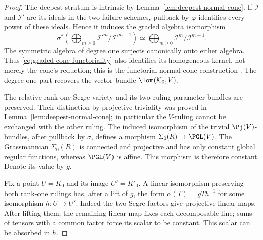 \begin{proof}
The deepest stratum is intrinsic by
Lemma~\ref{lem:deepest-normal-cone}.  If \(\mathcal I\) and
\(\mathcal I'\) are its ideals in the two failure schemes, pullback
by \(\varphi\) identifies every power of these ideals.  Hence it
induces the graded algebra isomorphism
\begin{equation}\label{eq:graded-cone-functoriality}
 \sigma^*\!\left(\bigoplus_{m\ge0}
                  \mathcal I'^m/\mathcal I'^{m+1}\right)
       \simeq \bigoplus_{m\ge0}\mathcal I^m/\mathcal I^{m+1}.
\end{equation}
The symmetric algebra of degree one surjects canonically onto either
algebra.  Thus \eqref{eq:graded-cone-functoriality} also identifies
its homogeneous kernel, not merely the cone's reduction; this is the
functorial normal-cone construction \cite{StacksNormalCone}.
The degree-one part recovers the vector bundle
\(\Hom(\mathcal K_0,V)\).

The relative rank-one Segre variety and its two ruling parameter
bundles are preserved.  Their distinction by projective triviality
was proved in Lemma~\ref{lem:deepest-normal-cone}; in particular the
\(V\)-ruling cannot be exchanged with the other ruling.  The induced
isomorphism of the trivial \(\Pj(V)\)-bundles, after pullback by
\(\sigma\), defines a morphism
\(\Sigma_0(R)\to\PGL(V)\).  The Grassmannian \(\Sigma_0(R)\)
is connected and projective and has only constant global regular
functions, whereas \(\PGL(V)\) is affine.  This morphism is therefore
constant.  Denote its value by \(g\).

Fix a point \(U=K_0\) and its image \(U'=K'_0\).  A linear
isomorphism preserving both rank-one rulings has, after a lift of
\(g\), the form
\(\alpha(T)=gTh^{-1}\) for some isomorphism \(h:U\to U'\).
Indeed the two Segre factors give projective linear maps.  After
lifting them, the remaining linear map fixes each decomposable line;
sums of tensors with a common factor force its scalar to be constant.
This scalar can be absorbed in \(h\).


\end{proof}
